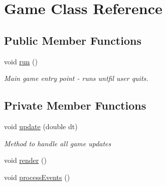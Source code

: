 \hypertarget{class_game}{}\section{Game Class Reference}
\label{class_game}
\subsection*{Public Member Functions}
\begin{DoxyCompactItemize}
\item 
void \mbox{\hyperlink{class_game_a1ab78f5ed0d5ea879157357cf2fb2afa}{run}} ()
\begin{DoxyCompactList}\small\item\em Main game entry point -\/ runs untfil user quits. \end{DoxyCompactList}\end{DoxyCompactItemize}
\subsection*{Private Member Functions}
\begin{DoxyCompactItemize}
\item 
void \mbox{\hyperlink{class_game_aa8c8ca9efb596230614be2f2f9e61b86}{update}} (double dt)
\begin{DoxyCompactList}\small\item\em Method to handle all game updates \end{DoxyCompactList}\item 
void \mbox{\hyperlink{class_game_a15ddd769261d923827a3cdf41499c843}{render}} ()
\item 
void \mbox{\hyperlink{class_game_a79f698dda206dd7a9bed28b3f88bdc38}{process\+Events}} ()
\end{DoxyCompactItemize}
